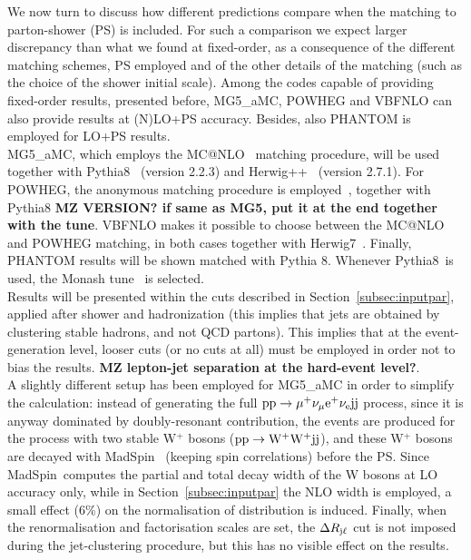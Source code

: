 We now turn to discuss how different predictions compare when the matching to parton-shower (PS) is included. For such
a comparison we expect larger discrepancy than what we found at fixed-order, as a consequence of the different
matching schemes, PS employed and of the other details of the matching (such as the choice of the shower initial scale). Among
the codes capable of providing fixed-order results, presented before, {\sc MG5\_aMC}, {\sc POWHEG} and {\sc VBFNLO}
can also provide results at (N)LO+PS accuracy. Besides, also {\sc PHANTOM} is employed for LO+PS results.\\
{\sc MG5\_aMC},
which
employs the {\sc MC@NLO}~\cite{Frixione:2002ik} matching procedure, will be used together with {\sc Pythia8}~\cite{Sjostrand:2014zea} (version 2.2.3) 
and {\sc Herwig++}~\cite{Bahr:2008pv, Bellm:2013hwb} (version 2.7.1). For {\sc POWHEG}, the anonymous matching procedure is 
employed~\cite{Nason:2004rx,Frixione:2007vw}, together with {\sc Pythia8} 
{\bf MZ VERSION? if same as MG5, put it at the end together with the tune}. {\sc VBFNLO} makes it possible to choose between the {\sc MC@NLO} and {\sc POWHEG}
matching, in both cases together with {\sc Herwig7}~\cite{}. Finally, {\sc PHANTOM} results will be shown matched with {\sc Pythia 8}.
Whenever {\sc Pythia8}\ is used, the Monash tune~\cite{Skands:2014pea} is selected.\\

Results will be presented within the cuts described in Section~\ref{subsec:inputpar}, applied after shower and hadronization (this implies that jets
are obtained by clustering stable hadrons, and not QCD partons). This implies that at the event-generation level, looser cuts (or no cuts at all) 
must be employed in order not to bias the results. {\bf MZ lepton-jet separation at the hard-event level?}.\\

A slightly different setup has been employed for {\sc MG5\_aMC} in order to simplify the calculation: instead of generating the full 
${\rm p}{\rm p}\to\mu^+\nu_\mu{\rm e}^+\nu_{\rm e}{\rm j}{\rm j}$ process, since it is anyway dominated by doubly-resonant contribution, the 
events are produced for the process with two stable W$^+$ bosons (${\rm p}{\rm p}\to{\rm W^+}{\rm W^+}{\rm j}{\rm j}$), and these W$^+$ bosons
are decayed with {\sc MadSpin}~\cite{Artoisenet:2012st} (keeping spin correlations) before the PS. Since {\sc MadSpin}\ computes 
the partial and total decay width of the W bosons at LO accuracy only, while in Section~\ref{subsec:inputpar} the NLO width is employed, 
a small effect (6\%) on the normalisation of distribution is induced. Finally, when the renormalisation
and factorisation scales are set, the $\Delta R_{\text{j}\ell}$ cut is not imposed during the jet-clustering procedure, but this has no visible effect 
on the results.

